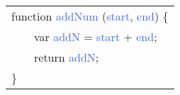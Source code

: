 \scriptsize\begin{tabular}[t]{>{\ttfamily}l}
\textcolor{myrose}{function} \textcolor{RoyalBlue}{addNum} (\textcolor{RoyalBlue}{start}, \textcolor{RoyalBlue}{end}) \{ \\
\ \ \ \ \textcolor{myrose}{var} \textcolor{RoyalBlue}{addN} = \textcolor{RoyalBlue}{start} + \textcolor{RoyalBlue}{end};\\
\ \ \ \ \textcolor{myrose}{return} \textcolor{RoyalBlue}{addN};\\
\}
\end{tabular}